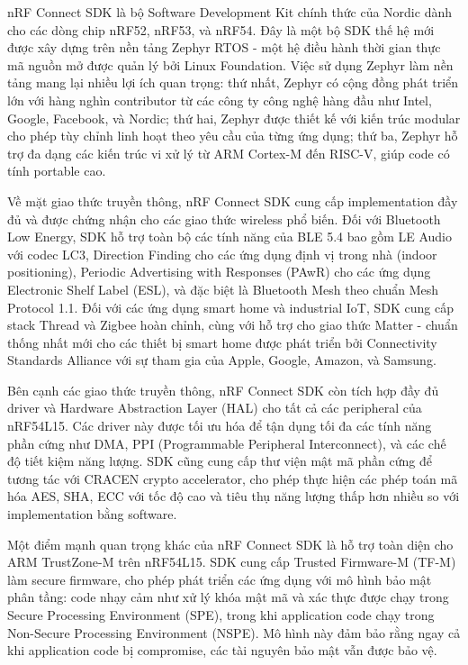 nRF Connect SDK là bộ Software Development Kit chính thức của Nordic dành cho các dòng chip nRF52, nRF53, và nRF54. Đây là một bộ SDK thế hệ mới được xây dựng trên nền tảng Zephyr RTOS - một hệ điều hành thời gian thực mã nguồn mở được quản lý bởi Linux Foundation. Việc sử dụng Zephyr làm nền tảng mang lại nhiều lợi ích quan trọng: thứ nhất, Zephyr có cộng đồng phát triển lớn với hàng nghìn contributor từ các công ty công nghệ hàng đầu như Intel, Google, Facebook, và Nordic; thứ hai, Zephyr được thiết kế với kiến trúc modular cho phép tùy chỉnh linh hoạt theo yêu cầu của từng ứng dụng; thứ ba, Zephyr hỗ trợ đa dạng các kiến trúc vi xử lý từ ARM Cortex-M đến RISC-V, giúp code có tính portable cao.

Về mặt giao thức truyền thông, nRF Connect SDK cung cấp implementation đầy đủ và được chứng nhận cho các giao thức wireless phổ biến. Đối với Bluetooth Low Energy, SDK hỗ trợ toàn bộ các tính năng của BLE 5.4 bao gồm LE Audio với codec LC3, Direction Finding cho các ứng dụng định vị trong nhà (indoor positioning), Periodic Advertising with Responses (PAwR) cho các ứng dụng Electronic Shelf Label (ESL), và đặc biệt là Bluetooth Mesh theo chuẩn Mesh Protocol 1.1. Đối với các ứng dụng smart home và industrial IoT, SDK cung cấp stack Thread và Zigbee hoàn chỉnh, cùng với hỗ trợ cho giao thức Matter - chuẩn thống nhất mới cho các thiết bị smart home được phát triển bởi Connectivity Standards Alliance với sự tham gia của Apple, Google, Amazon, và Samsung.

Bên cạnh các giao thức truyền thông, nRF Connect SDK còn tích hợp đầy đủ driver và Hardware Abstraction Layer (HAL) cho tất cả các peripheral của nRF54L15. Các driver này được tối ưu hóa để tận dụng tối đa các tính năng phần cứng như DMA, PPI (Programmable Peripheral Interconnect), và các chế độ tiết kiệm năng lượng. SDK cũng cung cấp thư viện mật mã phần cứng để tương tác với CRACEN crypto accelerator, cho phép thực hiện các phép toán mã hóa AES, SHA, ECC với tốc độ cao và tiêu thụ năng lượng thấp hơn nhiều so với implementation bằng software.

Một điểm mạnh quan trọng khác của nRF Connect SDK là hỗ trợ toàn diện cho ARM TrustZone-M trên nRF54L15. SDK cung cấp Trusted Firmware-M (TF-M) làm secure firmware, cho phép phát triển các ứng dụng với mô hình bảo mật phân tầng: code nhạy cảm như xử lý khóa mật mã và xác thực được chạy trong Secure Processing Environment (SPE), trong khi application code chạy trong Non-Secure Processing Environment (NSPE). Mô hình này đảm bảo rằng ngay cả khi application code bị compromise, các tài nguyên bảo mật vẫn được bảo vệ.

